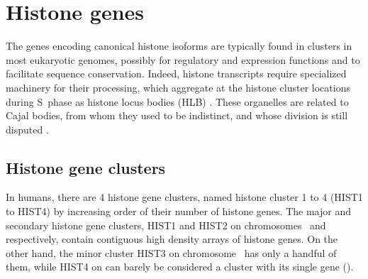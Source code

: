 \section{Histone genes}

  The genes encoding canonical histone isoforms are typically found in clusters in most
  eukaryotic genomes, possibly for regulatory and expression functions and to facilitate
  sequence conservation. Indeed, histone transcripts require specialized machinery for
  their processing, which aggregate at the histone cluster locations during S~phase as
  histone locus bodies (HLB) \citep{human-first-HLB-report, human-HLB-report-GhuleEtAl2008}.
  These organelles are related to Cajal bodies, from whom they used to be indistinct, and
  whose division is still disputed \citep{CB-HLB-review}.

  \subsection{Histone gene clusters}
    In humans, there are 4 histone gene clusters, named histone cluster 1 to 4 (HIST1 to HIST4)
    by increasing order of their number of histone genes.
    The major and secondary histone gene clusters,
    HIST1 and HIST2 on chromosomes~\HISTOneLocus{} and \HISTTwoLocus{} respectively,
    contain contiguous high density arrays of histone genes. On the other hand, the minor
    cluster HIST3 on chromosome~\HISTThreeLocus{} has only a handful of them, while HIST4
    on \HISTFourLocus{} can barely be considered a cluster with its single gene
    ().

